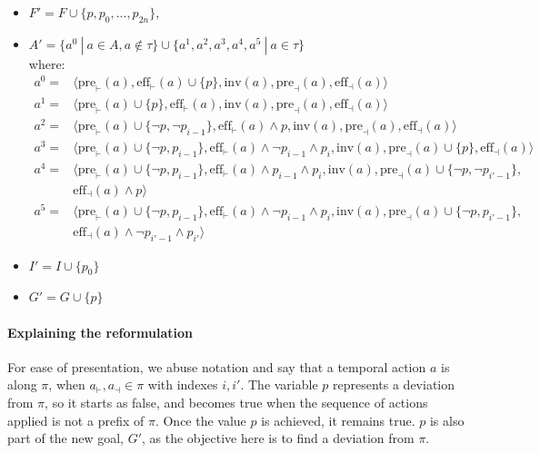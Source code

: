 \begin{itemize}
\item $F' = F \cup \{ p, p_0,..., p_{2n}\}$,
\item $A' = \{a^0 \ |\ a \in A, a \not\in \tau \} \cup  \{a^1,a^2,a^3,a^4,a^5 \ |\ a \in \tau \}$  \\
where:
\begin{align*}
a^0 = & \langle \text{pre}_{\vdash}(a), \text{eff}_{\vdash}(a) \cup \{p\} ,\text{inv}(a), \text{pre}_{\dashv}(a), \text{eff}_{\dashv}(a)\rangle\\ 
%
a^1 = & \langle \text{pre}_{\vdash}(a) \cup \{p\} , \text{eff}_{\vdash}(a), \text{inv}(a), \text{pre}_{\dashv}(a), \text{eff}_{\dashv}(a)\rangle\\
%
a^2 = & \langle \text{pre}_{\vdash}(a) \cup \{\neg p, \neg p_{i-1}\}, \text{eff}_{\vdash}(a) \land p, \text{inv}(a), 
 \text{pre}_{\dashv}(a),\text{eff}_{\dashv}(a)\rangle\\
%
a^3 = & \langle \text{pre}_{\vdash}(a) \cup \{\neg p, p_{i-1}\}, \text{eff}_{\vdash}(a) \land \neg p_{i-1} \land p_i, \text{inv}(a), \text{pre}_{\dashv}(a) \cup \{p\}, \text{eff}_{\dashv}(a)\rangle \\
%
a^4 =  & \langle \text{pre}_{\vdash}(a) \cup \{\neg p, p_{i-1}\}, \text{eff}_{\vdash}(a) \land p_{i-1} \land p_i, \text{inv}(a), \text{pre}_{\dashv}(a) \cup \{\neg p, \neg p_{i'-1}\}, \\ 
& \text{eff}_{\dashv}(a) \land p \rangle \\
%
a^5 = & \langle \text{pre}_{\vdash}(a) \cup \{\neg p, p_{i-1}\}, \text{eff}_{\vdash}(a) \land \neg p_{i-1} \land p_i, \text{inv}(a), \text{pre}_{\dashv}(a) \cup \{\neg p, p_{i'-1}\}, \\
&\text{eff}_{\dashv}(a) \land \neg p_{i'-1} \land p_{i'} \rangle
\end{align*}
\item $I' = I \cup \{p_0\}$
\item $G' = G \cup \{p\}$
\end{itemize}

\paragraph{Explaining the reformulation} For ease of presentation, we abuse notation and say that a temporal action $a$ is along $\pi$, when $a_{\vdash},a_{\dashv} \in \pi$ with indexes $i, i'$.
The variable $p$ represents a deviation from $\pi$, so it starts as false, and becomes true when the sequence of actions applied is not a prefix of $\pi$. Once the value $p$ is achieved, it remains true. $p$ is also part of the new goal, $G'$, as the objective here is to find a deviation from $\pi$.

